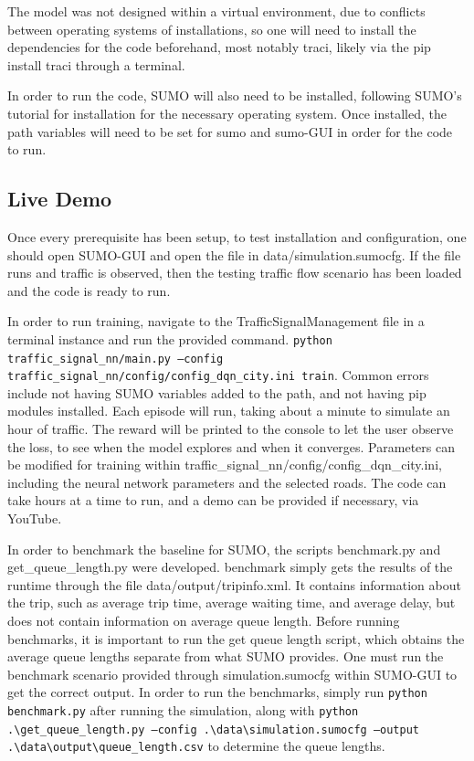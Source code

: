 \documentclass[conference]{IEEEtran}
\begin{document}
The model was not designed within a virtual environment, due to conflicts between operating systems of installations, so one will need to install the dependencies for the code beforehand, most notably traci, likely via the pip install traci through a terminal. 

In order to run the code, SUMO will also need to be installed, following SUMO's tutorial for installation for the necessary operating system. Once installed, the path variables will need to be set for sumo and sumo-GUI in order for the code to run.

\subsection{Live Demo}

Once every prerequisite has been setup, to test installation and configuration, one should open SUMO-GUI and open the file in data/simulation.sumocfg. If the file runs and traffic is observed, then the testing traffic flow scenario has been loaded and the code is ready to run. 

In order to run training, navigate to the TrafficSignalManagement file in a terminal instance and run the provided command. \texttt{\texttt{python traffic\_signal\_nn/main.py --config traffic\_signal\_nn/config/config\_dqn\_city.ini train}}. Common errors include not having SUMO variables added to the path, and not having pip modules installed. Each episode will run, taking about a minute to simulate an hour of traffic. The reward will be printed to the console to let the user observe the loss, to see when the model explores and when it converges. Parameters can be modified for training within traffic\_signal\_nn/config/config\_dqn\_city.ini, including the neural network parameters and the selected roads. The code can take hours at a time to run, and a demo can be provided if necessary, via YouTube. 

In order to benchmark the baseline for SUMO, the scripts benchmark.py and get\_queue\_length.py were developed. benchmark simply gets the results of the runtime through the file data/output/tripinfo.xml. It contains information about the trip, such as average trip time, average waiting time, and average delay, but does not contain information on average queue length. Before running benchmarks, it is important to run the get queue length script, which obtains the average queue lengths separate from what SUMO provides. One must run the benchmark scenario provided through simulation.sumocfg within SUMO-GUI to get the correct output. In order to run the benchmarks, simply run \texttt{python benchmark.py} after running the simulation, along with \texttt{python .\textbackslash get\_queue\_length.py --config .\textbackslash data\textbackslash simulation.sumocfg --output .\textbackslash data\textbackslash output\textbackslash queue\_length.csv} to determine the queue lengths. 
\end{document}
